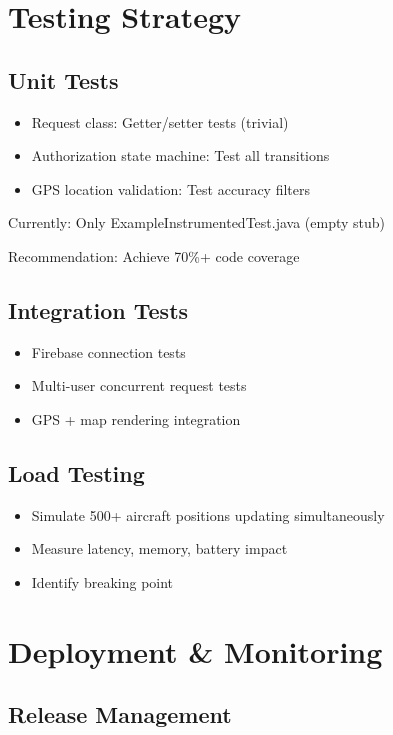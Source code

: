 \documentclass[11pt,a4paper]{report}
\begin{document}
\section{Testing Strategy}

\subsection{Unit Tests}

\begin{itemize}
    \item Request class: Getter/setter tests (trivial)
    \item Authorization state machine: Test all transitions
    \item GPS location validation: Test accuracy filters
\end{itemize}

Currently: Only ExampleInstrumentedTest.java (empty stub)

Recommendation: Achieve 70\%+ code coverage

\subsection{Integration Tests}

\begin{itemize}
    \item Firebase connection tests
    \item Multi-user concurrent request tests
    \item GPS + map rendering integration
\end{itemize}

\subsection{Load Testing}

\begin{itemize}
    \item Simulate 500+ aircraft positions updating simultaneously
    \item Measure latency, memory, battery impact
    \item Identify breaking point
\end{itemize}

\section{Deployment \& Monitoring}

\subsection{Release Management}
\end{document}
